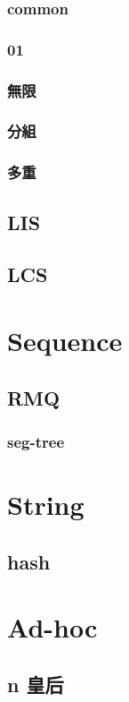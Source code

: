 \subsubsection{common}


\subsubsection{01}


\subsubsection{無限}


\subsubsection{分組}


\subsubsection{多重}


\subsection{LIS}


\subsection{LCS}


\section{Sequence}

\subsection{RMQ}
\subsubsection{seg-tree}


% 

\section{String}

\subsection{hash}


\section{Ad-hoc}

\subsection{n 皇后}

